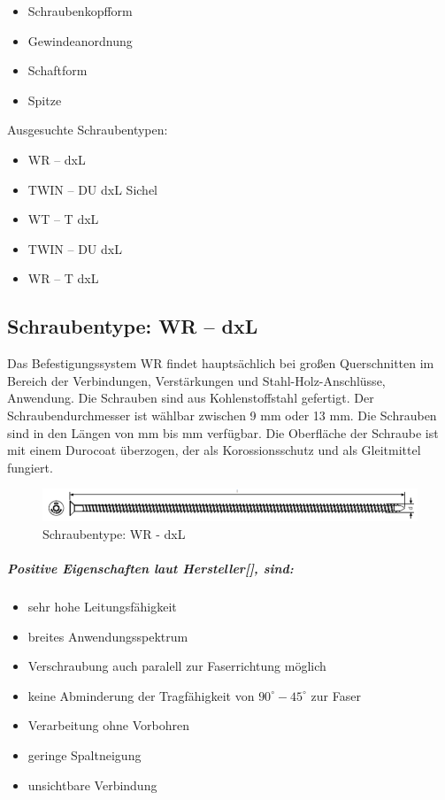 \begin{itemize}
	\item Schraubenkopfform
	\item Gewindeanordnung
	\item Schaftform
	\item Spitze
\end{itemize}

Ausgesuchte Schraubentypen: 


\begin{itemize}
	\item WR – dxL
	\item TWIN – DU dxL Sichel
	\item WT – T dxL 
	\item TWIN – DU dxL
	\item WR – T  dxL
\end{itemize}
	
\subsection{Schraubentype:	 WR – dxL}
Das Befestigungssystem WR findet hauptsächlich bei großen Querschnitten im Bereich der Verbindungen, Verstärkungen und Stahl-Holz-Anschlüsse, Anwendung. Die Schrauben sind aus Kohlenstoffstahl gefertigt. Der Schraubendurchmesser ist wählbar zwischen 9 mm oder 13 mm. Die Schrauben sind in den Längen von \unit[250]{mm} bis \unit[1000]{mm} verfügbar. Die Oberfläche der Schraube ist mit einem Durocoat überzogen, der als Korossionsschutz und als Gleitmittel fungiert.

\begin{figure}[h]
\begin{center}
\includegraphics[scale =0.7]{Verbindungsmittel/schrauben/WR-dxL.png}
\caption{Schraubentype: WR - dxL}
\end{center}
\end{figure}


\subparagraph{Positive Eigenschaften laut Hersteller[], sind:}

\begin{itemize}
	\item sehr hohe Leitungsfähigkeit
	\item breites Anwendungsspektrum
	\item Verschraubung auch paralell zur Faserrichtung möglich
	\item keine Abminderung der Tragfähigkeit von $90^\circ  -  45^\circ$ zur Faser
	\item Verarbeitung ohne Vorbohren
	\item geringe Spaltneigung
	\item unsichtbare Verbindung
\end{itemize}


